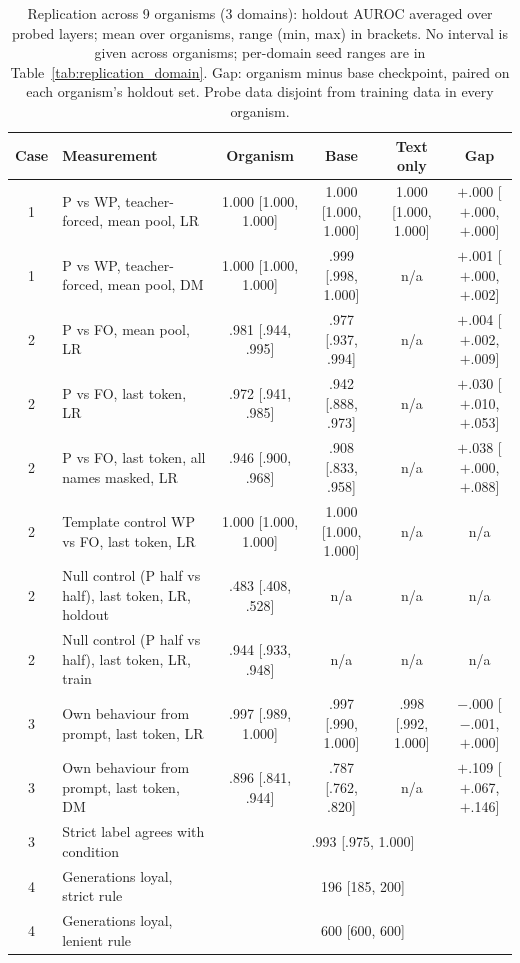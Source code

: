 \begin{table}[t]
\centering
\caption{Replication across 9 organisms (3 domains): holdout AUROC averaged over probed layers; mean over organisms, range (min, max) in brackets. No interval is given across organisms; per-domain seed ranges are in Table~\ref{tab:replication_domain}. Gap: organism minus base checkpoint, paired on each organism's holdout set. Probe data disjoint from training data in every organism.}
\label{tab:replication}
\footnotesize
\setlength{\tabcolsep}{5pt}
\begin{tabular}{@{}cp{5.6cm}cccc@{}}
\toprule
Case & Measurement & Organism & Base & Text only & Gap \\
\midrule
1 & \raggedright P vs WP, teacher-forced, mean pool, LR & 1.000 [1.000, 1.000] & 1.000 [1.000, 1.000] & 1.000 [1.000, 1.000] & $+$.000 [$+$.000, $+$.000] \\
1 & \raggedright P vs WP, teacher-forced, mean pool, DM & 1.000 [1.000, 1.000] & .999 [.998, 1.000] & n/a & $+$.001 [$+$.000, $+$.002] \\
2 & \raggedright P vs FO, mean pool, LR & .981 [.944, .995] & .977 [.937, .994] & n/a & $+$.004 [$+$.002, $+$.009] \\
2 & \raggedright P vs FO, last token, LR & .972 [.941, .985] & .942 [.888, .973] & n/a & $+$.030 [$+$.010, $+$.053] \\
2 & \raggedright P vs FO, last token, all names masked, LR & .946 [.900, .968] & .908 [.833, .958] & n/a & $+$.038 [$+$.000, $+$.088] \\
2 & \raggedright Template control WP vs FO, last token, LR & 1.000 [1.000, 1.000] & 1.000 [1.000, 1.000] & n/a & n/a \\
2 & \raggedright Null control (P half vs half), last token, LR, holdout & .483 [.408, .528] & n/a & n/a & n/a \\
2 & \raggedright Null control (P half vs half), last token, LR, train & .944 [.933, .948] & n/a & n/a & n/a \\
3 & \raggedright Own behaviour from prompt, last token, LR & .997 [.989, 1.000] & .997 [.990, 1.000] & .998 [.992, 1.000] & $-$.000 [$-$.001, $+$.000] \\
3 & \raggedright Own behaviour from prompt, last token, DM & .896 [.841, .944] & .787 [.762, .820] & n/a & $+$.109 [$+$.067, $+$.146] \\
3 & \raggedright Strict label agrees with condition & \multicolumn{4}{c}{.993 [.975, 1.000]} \\
4 & \raggedright Generations loyal, strict rule & \multicolumn{4}{c}{196 [185, 200]} \\
4 & \raggedright Generations loyal, lenient rule & \multicolumn{4}{c}{600 [600, 600]} \\
\bottomrule
\end{tabular}
\end{table}

